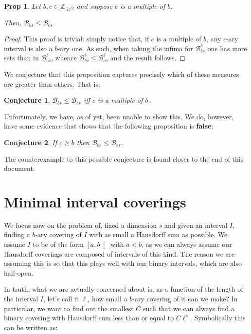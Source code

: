 \documentclass[11pt]{amsart}
\newcommand{\Z}{\mathbb{Z}}
\newcommand{\BB}{\mathcal{B}}
\newtheorem{prop}{Prop}
\newtheorem{conjecture}{Conjecture}
\begin{document}
\begin{prop}
Let $b, c \in \Z_{\geq 2}$ and suppose $c$ is a multiple of $b$.

Then, $\BB_{bs} \leq \BB_{cs}$
\end{prop}

\begin{proof}
This proof is trivial: simply notice that, if $c$ is a multiple of $b$, any $c$-ary interval is also a $b$-ary one. As such, when taking the infima for $\BB_{bs}^\delta$ one has more sets than in $\BB_{cs}^\delta$, whence $\BB_{bs}^\delta \leq \BB_{cs}^\delta$ and the result follows.
\end{proof}

We conjecture that this proposition captures precisely which of these measures are greater than others. That is:

\begin{conjecture}
$\BB_{bs} \leq \BB_{cs}$ iff $c$ is a multiple of $b$.
\end{conjecture}

Unfortunately, we have, as of yet, been unable to show this. We do, however, have some evidence that shows that the following proposition is \textbf{false}: 

\begin{conjecture}
If $c \geq b$ then $\BB_{bs} \leq \BB_{cs}$.
\end{conjecture}

The counterexample to this possible conjecture is found closer to the end of this document.

\section{Minimal interval coverings}

We focus now on the problem of, fixed a dimension $s$ and given an interval $I$, finding a $b$-ary covering of $I$ with as small a Hausdorff sum as possible. We assume $I$ to be of the form $\left[ a, b \right[$ with $a < b$, as we can always assume our Hausdorff coverings are composed of intervals of this kind. The reason we are assuming this is so that this plays well with our binary intervals, which are also half-open.

In truth, what we are actually concerned about is, as a function of the length of the interval $I$, let's call it $\ell$, how small a $b$-ary covering of it can we make? In particular, we want to find out the smallest $C$ such that we can always find a binary covering with Hausdorff sum less than or equal to $C \ell^s$. Symbolically this can be written as:
\end{document}
